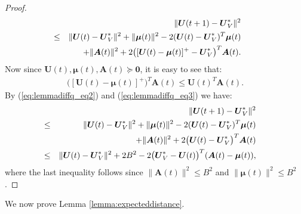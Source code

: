 \documentclass[journal]{IEEEtran}
\newcommand{\bv}[1]{{\boldsymbol{#1} }}
\begin{document}
\begin{proof}
\begin{eqnarray}
\hspace{-.3in}&&\|\bv{U}(t+1)-\bv{U}^*_V\|^2\label{eq:lemmadiffq_eq2}\\
\hspace{-.3in}&\leq& \|\bv{U}(t)-\bv{U}^*_V\|^2+\|\bv{\mu}(t)\|^2-2(\bv{U}(t)-\bv{U}^*_V)^T\bv{\mu}(t)\nonumber\\
\hspace{-.3in}&& + \|\bv{A}(t)\|^2+ 2\big([\bv{U}(t)-\bv{\mu}(t)]^+-\bv{U}^*_V\big)^T\bv{A}(t).\nonumber
\end{eqnarray}
Now since $\bv{U}(t), \bv{\mu}(t), \bv{A}(t)\succeq\bv{0}$,  it is easy to see that:
\begin{eqnarray}
\big([\bv{U}(t)-\bv{\mu}(t)]^+\big)^T\bv{A}(t)\leq \bv{U}(t)^T\bv{A}(t).\label{eq:lemmadiffq_eq3}
\end{eqnarray}
By (\ref{eq:lemmadiffq_eq2}) and (\ref{eq:lemmadiffq_eq3}) we have:
\begin{eqnarray*}
\hspace{-.2in}&&\|\bv{U}(t+1)-\bv{U}^*_V\|^2\\
\hspace{-.2in}&\leq& \|\bv{U}(t)-\bv{U}^*_V\|^2+\|\bv{\mu}(t)\|^2-2(\bv{U}(t)-\bv{U}^*_V)^T\bv{\mu}(t)\\
\hspace{-.2in}&& + \|\bv{A}(t)\|^2+ 2\big(\bv{U}(t)-\bv{U}^*_V\big)^T\bv{A}(t)\\
\hspace{-.2in}&\leq& \|\bv{U}(t)-\bv{U}^*_V\|^2+2B^2- 2\big(\bv{U}^*_V-\bv{U}(t)\big)^T(\bv{A}(t)-\bv{\mu}(t)), 
\end{eqnarray*}
where the last inequality follows since $\|\bv{A}(t)\|^2\leq B^2$ and $\|\bv{\mu}(t)\|^2\leq B^2$.
\end{proof}

We now prove Lemma \ref{lemma:expecteddistance}.
\end{document}
